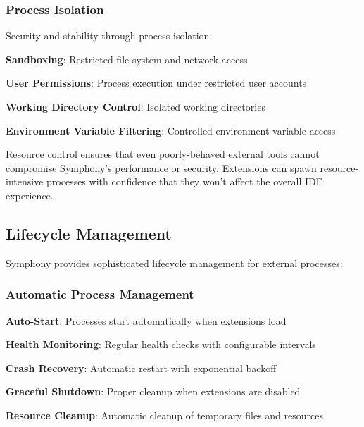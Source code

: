 \subsubsection*{Process Isolation}

Security and stability through process isolation:

\begin{compactlist}
    \item \textbf{Sandboxing}: Restricted file system and network access
    \item \textbf{User Permissions}: Process execution under restricted user accounts
    \item \textbf{Working Directory Control}: Isolated working directories
    \item \textbf{Environment Variable Filtering}: Controlled environment variable access
\end{compactlist}

\begin{successbox}
Resource control ensures that even poorly-behaved external tools cannot compromise Symphony's performance or security. Extensions can spawn resource-intensive processes with confidence that they won't affect the overall IDE experience.
\end{successbox}

\subsection*{Lifecycle Management}

Symphony provides sophisticated lifecycle management for external processes:

\subsubsection*{Automatic Process Management}

\begin{expandedlist}
    \item \textbf{Auto-Start}: Processes start automatically when extensions load
    \item \textbf{Health Monitoring}: Regular health checks with configurable intervals
    \item \textbf{Crash Recovery}: Automatic restart with exponential backoff
    \item \textbf{Graceful Shutdown}: Proper cleanup when extensions are disabled
    \item \textbf{Resource Cleanup}: Automatic cleanup of temporary files and resources
\end{expandedlist}

